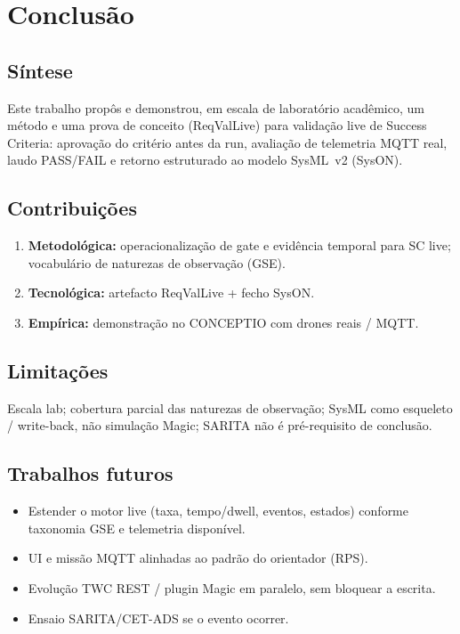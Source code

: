 \chapter{Conclusão}
\label{cap:conclusao}


\section{Síntese}

Este trabalho propôs e demonstrou, em escala de laboratório acadêmico, um método
e uma prova de conceito (ReqValLive) para validação live de Success Criteria:
aprovação do critério antes da run, avaliação de telemetria MQTT real, laudo
PASS/FAIL e retorno estruturado ao modelo SysML~v2 (SysON).

\section{Contribuições}

\begin{enumerate}
  \item \textbf{Metodológica:} operacionalização de gate e evidência temporal
        para SC live; vocabulário de naturezas de observação (GSE).
  \item \textbf{Tecnológica:} artefacto ReqValLive + fecho SysON.
  \item \textbf{Empírica:} demonstração no CONCEPTIO com drones reais / MQTT.
\end{enumerate}

\section{Limitações}

Escala lab; cobertura parcial das naturezas de observação; SysML como esqueleto /
write-back, não simulação Magic; SARITA não é pré-requisito de conclusão.

\section{Trabalhos futuros}

\begin{itemize}
  \item Estender o motor live (taxa, tempo/dwell, eventos, estados) conforme
        taxonomia GSE e telemetria disponível.
  \item UI e missão MQTT alinhadas ao padrão do orientador (RPS).
  \item Evolução TWC REST / plugin Magic em paralelo, sem bloquear a escrita.
  \item Ensaio SARITA/CET-ADS se o evento ocorrer.
\end{itemize}
